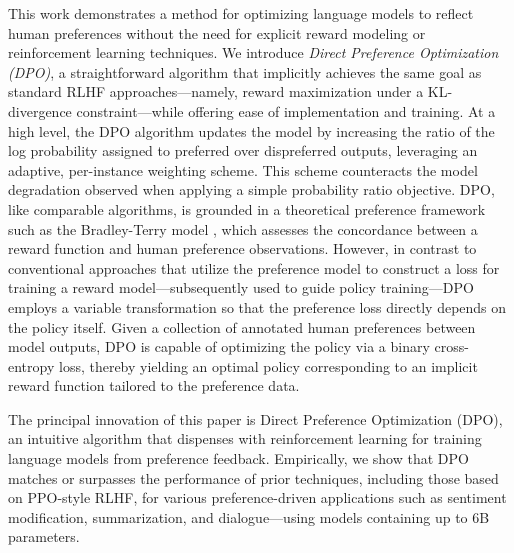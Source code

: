 This work demonstrates a method for optimizing language models to reflect human preferences without the need for explicit reward modeling or reinforcement learning techniques. We introduce \textit{Direct Preference Optimization (DPO)}, a straightforward algorithm that implicitly achieves the same goal as standard RLHF approaches—namely, reward maximization under a KL-divergence constraint—while offering ease of implementation and training. At a high level, the DPO algorithm updates the model by increasing the ratio of the log probability assigned to preferred over dispreferred outputs, leveraging an adaptive, per-instance weighting scheme. This scheme counteracts the model degradation observed when applying a simple probability ratio objective. DPO, like comparable algorithms, is grounded in a theoretical preference framework such as the Bradley-Terry model \cite{bradley1952rankanalysis}, which assesses the concordance between a reward function and human preference observations. However, in contrast to conventional approaches that utilize the preference model to construct a loss for training a reward model—subsequently used to guide policy training—DPO employs a variable transformation so that the preference loss directly depends on the policy itself. Given a collection of annotated human preferences between model outputs, DPO is capable of optimizing the policy via a binary cross-entropy loss, thereby yielding an optimal policy corresponding to an implicit reward function tailored to the preference data.

The principal innovation of this paper is Direct Preference Optimization (DPO), an intuitive algorithm that dispenses with reinforcement learning for training language models from preference feedback. Empirically, we show that DPO matches or surpasses the performance of prior techniques, including those based on PPO-style RLHF, for various preference-driven applications such as sentiment modification, summarization, and dialogue—using models containing up to 6B parameters.

